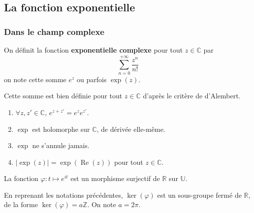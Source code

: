 




  \subsection{La fonction exponentielle}

  \subsubsection{Dans le champ complexe}


  \begin{definition}
    \label{244-1}
    On définit la fonction \textbf{exponentielle complexe} pour tout $z \in \mathbb{C}$ par
    \[ \sum_{n=0}^{+\infty} \frac{z^n}{n!} \]
    on note cette somme $e^z$ ou parfois $\exp(z)$.
  \end{definition}

  \begin{remark}
    Cette somme est bien définie pour tout $z \in \mathbb{C}$ d'après le critère de d'Alembert.
  \end{remark}

  \begin{proposition}
    \begin{enumerate}[label={\bfseries(\roman*)}]
      \item $\forall z, z' \in \mathbb{C}, \, e^{z+z'} = e^z e^{z'}$.
      \item $\exp$ est holomorphe sur $\mathbb{C}$, de dérivée elle-même.
      \item $\exp$ ne s'annule jamais.
      \item $\vert \exp(z) \vert = \exp(\operatorname{Re}(z))$ pour tout $z \in \mathbb{C}$.
    \end{enumerate}
  \end{proposition}

  \begin{proposition}
    La fonction $\varphi : t \mapsto e^{it}$ est un morphisme surjectif de $\mathbb{R}$ sur $\mathbb{U}$.
  \end{proposition}

  \begin{proposition}
    En reprenant les notations précédentes, $\ker(\varphi)$ est un sous-groupe fermé de $\mathbb{R}$, de la forme $\ker(\varphi) = a\mathbb{Z}$. On note $a = 2\pi$.
  \end{proposition}

